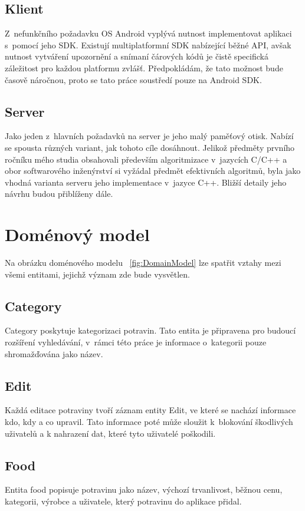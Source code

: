 \documentclass[thesis=B,czech]{FITthesis}[2013/10/20]
\begin{document}
\subsection{Klient}

Z~nefunkčního požadavku OS Android vyplývá nutnost implementovat aplikaci s~pomocí jeho SDK. Existují multiplatformní SDK nabízející běžné API, avšak nutnost vytváření upozornění a snímaní čárových kódů je čistě specifická záležitost pro každou platformu zvlášť. Předpokládám, že tato možnost bude časově náročnou, proto se tato práce soustředí pouze na Android SDK.

\subsection{Server}

Jako jeden z~hlavních požadavků na server je jeho malý paměťový otisk. Nabízí se spousta různých variant, jak tohoto cíle dosáhnout. Jelikož předměty prvního ročníku mého studia obsahovali především algoritmizace v~jazycích C/C++ a obor softwarového inženýrství si vyžádal předmět efektivních algoritmů, byla jako vhodná varianta serveru jeho implementace v~jazyce C++. Bližší detaily jeho návrhu budou přiblíženy dále.

\section{Doménový model}

Na obrázku doménového modelu ~\ref{fig:DomainModel} lze spatřit vztahy mezi všemi entitami, jejichž význam zde bude vysvětlen.

\subsection{Category}
Category poskytuje kategorizaci potravin. Tato entita je připravena pro budoucí rozšíření vyhledávání, v~rámci této práce je informace o~kategorii pouze shromažďována jako název.

\subsection{Edit}
Každá editace potraviny tvoří záznam entity Edit, ve které se nachází informace kdo, kdy a co upravil. Tato informace poté může sloužit k~blokování škodlivých uživatelů a k nahrazení dat, které tyto uživatelé poškodili.

\subsection{Food}
Entita food popisuje potravinu jako název, výchozí trvanlivost, běžnou cenu, kategorii, výrobce a uživatele, který potravinu do aplikace přidal.
\end{document}
